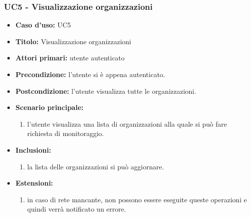 \documentclass[casi-duso]{subfiles}
\begin{document}
\subsubsection{UC5 - Visualizzazione organizzazioni}
\label{subsub:uc5utente}
\begin{itemize}
  \item \textbf{Caso d’uso:} UC5 
  \item \textbf{Titolo:} Visualizzazione organizzazioni
  \item \textbf{Attori primari:} utente autenticato
  \item \textbf{Precondizione:} l'utente si è appena autenticato.
  \item \textbf{Postcondizione:} l'utente visualizza tutte le organizzazioni.
  \item \textbf{Scenario principale:} 
  \begin{enumerate}
    \item l'utente visualizza una lista di organizzazioni alla quale si può fare richiesta di monitoraggio.
  \end{enumerate}  
  \item \textbf{Inclusioni:} 
  \begin{enumerate}
    \item la lista delle organizzazioni si può aggiornare.
  \end{enumerate}
  \item \textbf{Estensioni:} 
  \begin{enumerate}
    \item in caso di rete mancante, non possono essere eseguite queste operazioni e quindi verrà notificato un errore.
  \end{enumerate}  
\end{itemize}

\end{document}
